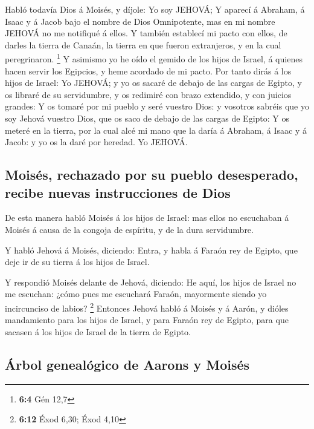  Habló todavía Dios á Moisés, y díjole: Yo soy JEHOVÁ;
 Y aparecí á Abraham, á Isaac y á Jacob bajo el nombre de
Dios Omnipotente, mas en mi nombre JEHOVÁ no me notifiqué á ellos.
 Y también establecí mi pacto con ellos, de darles la
tierra de Canaán, la tierra en que fueron extranjeros, y en la cual
peregrinaron. \footnote{\textbf{6:4} Gén 12,7}  Y asimismo
yo he oído el gemido de los hijos de Israel, á quienes hacen servir los
Egipcios, y heme acordado de mi pacto.  Por tanto dirás á
los hijos de Israel: Yo JEHOVÁ; y yo os sacaré de debajo de las cargas
de Egipto, y os libraré de su servidumbre, y os redimiré con brazo
extendido, y con juicios grandes:  Y os tomaré por mi
pueblo y seré vuestro Dios: y vosotros sabréis que yo soy Jehová vuestro
Dios, que os saco de debajo de las cargas de Egipto:  Y os
meteré en la tierra, por la cual alcé mi mano que la daría á Abraham, á
Isaac y á Jacob: y yo os la daré por heredad. Yo JEHOVÁ.

\hypertarget{moisuxe9s-rechazado-por-su-pueblo-desesperado-recibe-nuevas-instrucciones-de-dios}{%
\subsection{Moisés, rechazado por su pueblo desesperado, recibe nuevas
instrucciones de
Dios}\label{moisuxe9s-rechazado-por-su-pueblo-desesperado-recibe-nuevas-instrucciones-de-dios}}

 De esta manera habló Moisés á los hijos de Israel: mas
ellos no escuchaban á Moisés á causa de la congoja de espíritu, y de la
dura servidumbre.

 Y habló Jehová á Moisés, diciendo: 
Entra, y habla á Faraón rey de Egipto, que deje ir de su tierra á los
hijos de Israel.

 Y respondió Moisés delante de Jehová, diciendo: He aquí,
los hijos de Israel no me escuchan: ¿cómo pues me escuchará Faraón,
mayormente siendo yo incircunciso de labios? \footnote{\textbf{6:12}
  Éxod 6,30; Éxod 4,10}  Entonces Jehová habló á Moisés y
á Aarón, y dióles mandamiento para los hijos de Israel, y para Faraón
rey de Egipto, para que sacasen á los hijos de Israel de la tierra de
Egipto.

\hypertarget{uxe1rbol-genealuxf3gico-de-aarons-y-moisuxe9s}{%
\subsection{Árbol genealógico de Aarons y
Moisés}\label{uxe1rbol-genealuxf3gico-de-aarons-y-moisuxe9s}}

